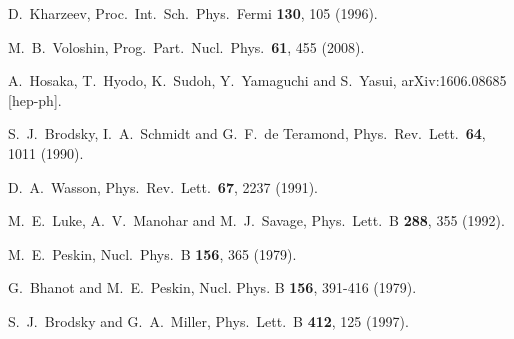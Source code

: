\documentclass[prd,amsmath,%
twocolumn,floatfix,amssymb, preprintnumbers, linenumbers,nofootinbib, superscriptaddress]{revtex4}
\begin{document}
\begin{thebibliography}{99}

  D.~Kharzeev,
  Proc.\ Int.\ Sch.\ Phys.\ Fermi {\bf 130}, 105 (1996).

  M.~B.~Voloshin,
  Prog.\ Part.\ Nucl.\ Phys.\  {\bf 61}, 455 (2008).
  
  A.~Hosaka, T.~Hyodo, K.~Sudoh, Y.~Yamaguchi and S.~Yasui,
  arXiv:1606.08685 [hep-ph].

  S.~J.~Brodsky, I.~A.~Schmidt and G.~F.~de Teramond,
  Phys.\ Rev.\ Lett.\  {\bf 64}, 1011 (1990).
  
  D.~A.~Wasson,
  Phys.\ Rev.\ Lett.\  {\bf 67}, 2237 (1991).
  
  M.~E.~Luke, A.~V.~Manohar and M.~J.~Savage,
  Phys.\ Lett.\ B {\bf 288}, 355 (1992). 

  M.~E.~Peskin,
  Nucl.\ Phys.\ B {\bf 156}, 365 (1979).

G.~Bhanot and M.~E.~Peskin,
Nucl. Phys. B \textbf{156}, 391-416 (1979).



  S.~J.~Brodsky and G.~A.~Miller,
  Phys.\ Lett.\ B {\bf 412}, 125 (1997).


\end{thebibliography}
\end{document}
